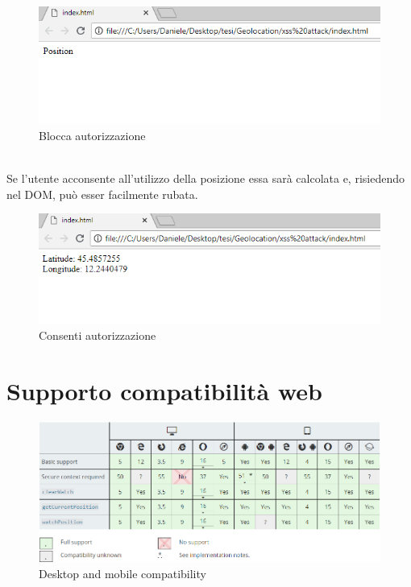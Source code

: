 \documentclass[11pt ,a4paper , twoside , openright ]{article}
\begin{document}
\begin{figure}[h]
	\centering
	\includegraphics[width=1\linewidth]{Blocca}
	\caption{Blocca autorizzazione}
	\label{fig: Blocca autorizzazione}
\end{figure}
\pagebreak
\\
Se l'utente acconsente all'utilizzo della posizione essa sarà calcolata e, risiedendo nel DOM, può esser facilmente rubata.
\begin{figure}[h]
	\centering
	\includegraphics[width=1\linewidth]{Consenti}
	\caption{Consenti autorizzazione}
	\label{fig: Consenti autorizzazione}
\end{figure}
\newpage
\section{Supporto compatibilità web}
\begin{figure}[h]
	\centering
	\includegraphics[width=1\linewidth]{compatibility}
	\caption{Desktop and mobile compatibility}
	\label{fig: Desktop and mobile compatibility}
\end{figure}
\end{document}
